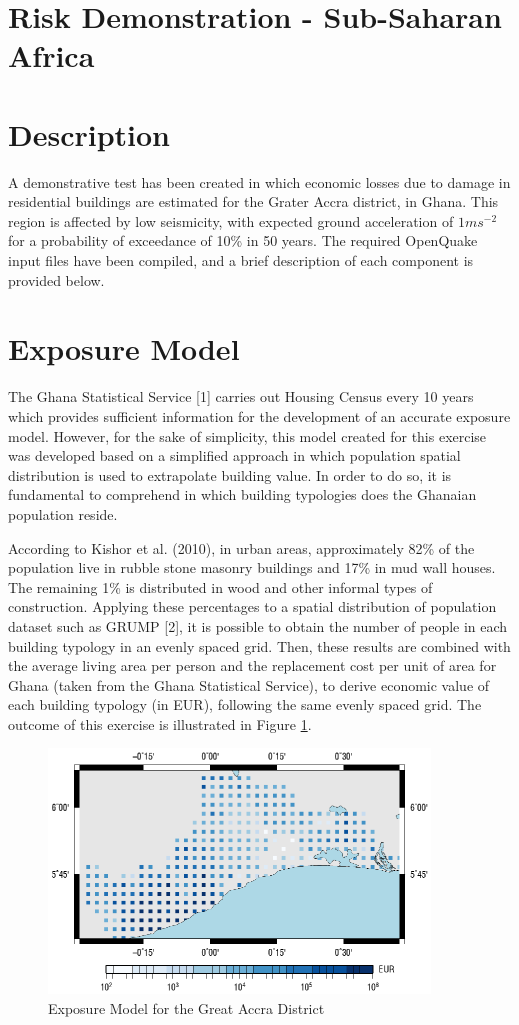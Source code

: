 \section{Risk Demonstration - Sub-Saharan Africa}

\section{Description}
A demonstrative test has been created in which economic losses due 
to damage in residential buildings are estimated for the Grater Accra 
district, in Ghana. This region is affected by low seismicity, with 
expected ground acceleration of $1 ms^{-2}$ for a probability of 
exceedance of 10\% in 50 years. The required OpenQuake input files
have been compiled, and a brief description of each component is 
provided below. 

\section{Exposure Model}
The Ghana Statistical Service [1] carries out Housing Census every
10 years which provides sufficient information for the development 
of an accurate exposure model. However, for the sake of simplicity,
this model created for this exercise was developed based on a simplified
approach in which population spatial distribution is used to extrapolate 
building value. In order to do so, it is fundamental to comprehend in
which building typologies does the Ghanaian population reside. 

According to Kishor et al. (2010), in urban areas, approximately 
82\% of the population live in rubble stone masonry buildings and 
17\% in mud wall houses. The remaining 1\% is distributed in wood
and other informal types of construction. Applying these percentages
to a spatial distribution of population dataset such as GRUMP [2], 
it is possible to obtain the number of people in each building 
typology in an evenly spaced grid. Then, these results are combined
with the average living area per person and the replacement cost 
per unit of area for Ghana (taken from the Ghana Statistical Service),
to derive economic value of each building typology (in EUR), 
following the same evenly spaced grid. The outcome of this 
exercise is illustrated in Figure \ref{fig:accra_exposure}.

\begin{figure}[htb]
	\centering
		\includegraphics[height=6.5cm, keepaspectratio=true]{./figures/exposure.eps}
	\caption{Exposure Model for the Great Accra District}
	\label{fig:accra_exposure}
\end{figure}

